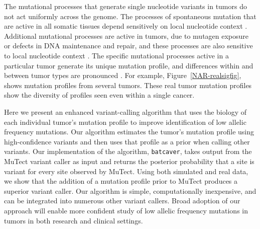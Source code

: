 \documentclass[a4,center,fleqn]{NAR}
\begin{document}
The mutational processes that generate single nucleotide variants in tumors do not act uniformly across the genome.
The processes of spontaneous mutation that are active in all somatic tissues depend sensitively on local nucleotide context \citep{Nik-Zainal2012a,Alexandrov2015,Lee-Six2018}. 
Additional mutational processes are active in tumors, due to mutagen exposure or defects in DNA maintenance and repair, and these processes are also sensitive to local nucleotide context \citep{Alexandrov2013a,Helleday2014a,Nik-Zainal2016,Kandoth2013,Alexandrov2016}.
The specific mutational processes active in a particular tumor generate its unique mutation profile, and differences within and between tumor types are pronounced \cite{Stephens2005, Burrell2013a, Nakamura2015, Witkiewicz2015, Kumar2016}.
For example, Figure~\ref{NAR-realsigfig}, shows mutation profiles from several tumors.
These real tumor mutation profiles show the diversity of profiles seen even within a single cancer.

Here we present an enhanced variant-calling algorithm that uses the biology of each individual tumor's mutation profile to improve identification of low allelic frequency mutations.
Our algorithm estimates the tumor's mutation profile using high-confidence variants and then uses that profile as a prior when calling other variants.
Our implementation of the algorithm, \texttt{batcaver}, takes output from the MuTect variant caller as input and returns the posterior probability that a site is variant for every site observed by MuTect.
Using both simulated and real data, we show that the addition of a mutation profile prior to MuTect produces a superior variant caller.
Our algorithm is simple, computationally inexpensive, and can be integrated into numerous other variant callers.
Broad adoption of our approach will enable more confident study of low allelic frequency mutations in tumors in both research and clinical settings.
\end{document}
